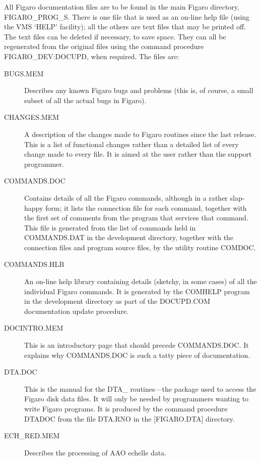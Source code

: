 All Figaro documentation files are to be found in the main Figaro 
directory, FIGARO\_PROG\_S. There is one file that is used as an on-line help
file (using the VMS `HELP' facility); all the others are text files that 
may be printed off. The text files can be deleted if necessary, to save
space. They can all be regenerated from  the  original  files using
the  command  procedure FIGARO\_DEV:DOCUPD, when required. The files are:

\begin{description} 

\item [BUGS.MEM] Describes any known Figaro bugs and problems (this is, 
of course, a small subset of all the actual bugs in Figaro).

\item [CHANGES.MEM] A description of the changes made to Figaro routines
since the last release. This is a list of functional changes rather than a 
detailed list of every change made to every file. It is aimed at the 
user rather than  the  support programmer.

\item [COMMANDS.DOC] Contains details of all the Figaro commands, although
in a rather slap-happy form; it lists the connection file for each 
command, together with the first set of comments from the program that
services that command. This file is generated from the list of commands 
held in COMMANDS.DAT  in  the  development  directory, together with the 
connection files and program source files, by the utility routine COMDOC.

\item [COMMANDS.HLB] An on-line help library containing details (sketchy, 
in some cases) of all the individual Figaro commands. It is generated 
by the COMHELP program in the development directory as part of the 
DOCUPD.COM documentation update procedure.

\item [DOCINTRO.MEM] This is an introductory page that should precede
COMMANDS.DOC. It explains why COMMANDS.DOC is such a tatty piece of
documentation.

\item [DTA.DOC] This is the manual for the DTA\_ routines---the package 
used to access the Figaro disk data files. It will only be needed by 
programmers wanting to write Figaro programs. It is produced by the command 
procedure DTADOC from the file DTA.RNO in the [FIGARO.DTA] directory.

\item [ECH\_RED.MEM] Describes the processing of AAO echelle data.


\end{description}

